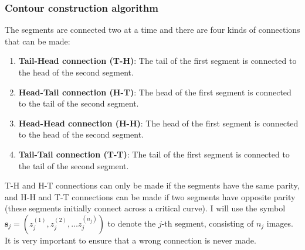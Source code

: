 \documentclass[12pt,dvipsnames]{report}
\begin{document}
\subsubsection{Contour construction algorithm}
The segments are connected two at a time and there are four kinds of connections that 
can be made:
\begin{enumerate}
    \item \textbf{Tail-Head connection (T-H)}: The tail of the first segment is connected to the head of the 
    second segment.
    \item \textbf{Head-Tail connection (H-T)}: The head of the first segment is connected to the tail of the
    second segment.
    \item \textbf{Head-Head connection (H-H)}: The head of the first segment is connected to the head of the
    second segment.
    \item \textbf{Tail-Tail connection (T-T)}: The tail of the first segment is connected to the tail of the
    second segment.
\end{enumerate}
T-H and H-T connections can only be made if the segments have the same parity, and H-H and T-T
connections can be made if two segments have opposite parity (these segments initially 
connect across a critical curve). I will use the symbol 
$\mathbf{s}_j=(z^{(1)}_j, z^{(2)}_j,\ldots z^{(n_j)}_j)$ to denote the $j$-th segment, consisting
of $n_j$ images. It is very important to ensure that a wrong connection is never made.
\end{document}
